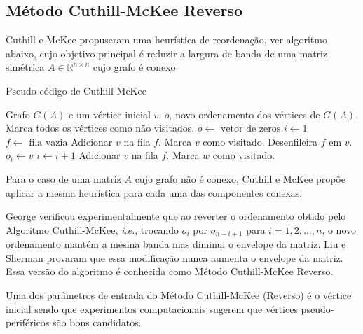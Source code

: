 \subsection{Método Cuthill-McKee Reverso}
Cuthill e McKee \cite{Cuthill:1969:ReducingBandwidth} propuseram uma heurística de
reordenação, ver algoritmo abaixo, cujo objetivo principal é reduzir a largura
de banda de uma matriz simétrica $A \in \mathbb{R}^{n \times n}$ cujo grafo
é conexo.
\begin{algorithm}[hbt]
    \caption{Pseudo-código de Cuthill-McKee}
    \label{alg:rcm}
    \begin{algorithmic}[1]
        \REQUIRE Grafo $G(A)$ e um vértice inicial $v$.
        \ENSURE $o$, novo ordenamento dos vértices de $G(A)$.
        \STATE Marca todos os vértices como não visitados.
        \STATE $o \longleftarrow \text{ vetor de zeros}$
        \STATE $i \longleftarrow 1$
        \STATE $f \longleftarrow \text{ fila vazia}$
        \STATE Adicionar $v$ na fila $f$.
        \STATE Marca $v$ como visitado.
            \STATE Desenfileira $f$ em $v$.
            \STATE $o_i \longleftarrow v$
            \STATE $i \longleftarrow i + 1$
                    \STATE Adicionar $v$ na fila $f$.
                    \STATE Marca $w$ como visitado.
                \ENDIF
            \ENDFOR
        \ENDWHILE
    \end{algorithmic}
\end{algorithm}

Para o caso de uma matriz $A$ cujo grafo não é conexo, Cuthill e McKee propõe
aplicar a mesma heurística para cada uma das componentes conexas.

George \cite{George:1971:ComputerImplementation} verificou
experimentalmente que ao reverter o ordenamento obtido pelo Algoritmo
Cuthill-McKee, \textit{i.e.}, trocando $o_i$ por $o_{n - i + 1}$ para $i = 1, 2,
\ldots, n$, o novo ordenamento mantém a mesma banda mas diminui o
envelope da matriz. Liu e Sherman \cite{Liu:1976:ComparativeCuthillMcKee}
provaram que essa modificação nunca aumenta o envelope da matriz. Essa versão do
algoritmo é conhecida como Método Cuthill-McKee Reverso.

Uma dos parâmetros de entrada do Método Cuthill-McKee (Reverso) é o vértice inicial sendo
que experimentos computacionais \cite{Cuthill:1969:ReducingBandwidth} sugerem que
vértices pseudo-periféricos são bons candidatos.

